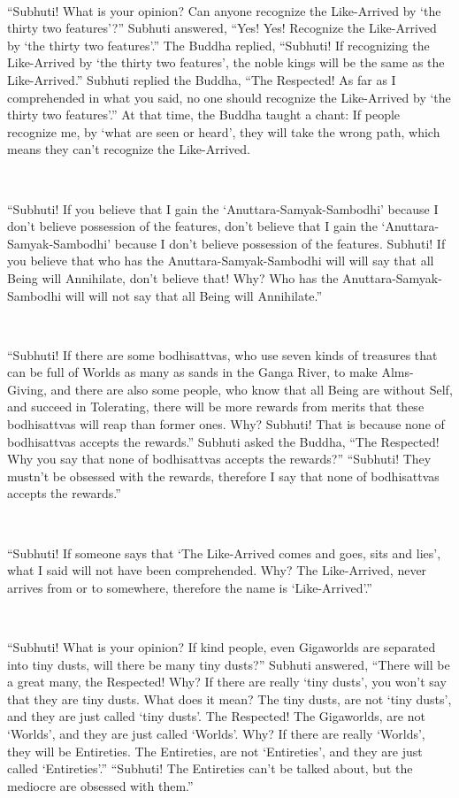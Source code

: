 \documentclass[a5paper,12pt]{book}
\begin{document}
    ~

     ``Subhuti! What is your opinion? Can anyone recognize the Like-Arrived by `the thirty two features'?'' Subhuti answered, ``Yes! Yes! Recognize the Like-Arrived by `the thirty two features'.'' The Buddha replied, ``Subhuti! If recognizing the Like-Arrived by `the thirty two features', the noble kings will be the same as the Like-Arrived.'' Subhuti replied the Buddha, ``The Respected! As far as I comprehended in what you said, no one should recognize the Like-Arrived by `the thirty two features'.'' At that time, the Buddha taught a chant: If people recognize me, by `what are seen or heard', they will take the wrong path, which means they can't recognize the Like-Arrived.

    ~

     ``Subhuti! If you believe that I gain the `Anuttara-Samyak-Sambodhi' because I don't believe possession of the features, don't believe that I gain the `Anuttara-Samyak-Sambodhi' because I don't believe possession of the features. Subhuti! If you believe that who has the Anuttara-Samyak-Sambodhi will will say that all Being will Annihilate, don't believe that! Why? Who has the Anuttara-Samyak-Sambodhi will will not say that all Being will Annihilate.''

    ~

     ``Subhuti! If there are some bodhisattvas, who use seven kinds of treasures that can be full of Worlds as many as sands in the Ganga River, to make Alms-Giving, and there are also some people, who know that all Being are without Self, and succeed in Tolerating, there will be more rewards from merits that these bodhisattvas will reap than former ones. Why? Subhuti! That is because none of bodhisattvas accepts the rewards.'' Subhuti asked the Buddha, ``The Respected! Why you say that none of bodhisattvas accepts the rewards?'' ``Subhuti! They mustn't be obsessed with the rewards, therefore I say that none of bodhisattvas accepts the rewards.''

    ~

     ``Subhuti! If someone says that `The Like-Arrived comes and goes, sits and lies', what I said will not have been comprehended. Why? The Like-Arrived, never arrives from or to somewhere, therefore the name is `Like-Arrived'.''

    ~

     ``Subhuti! What is your opinion? If kind people, even Gigaworlds are separated into tiny dusts, will there be many tiny dusts?'' Subhuti answered, ``There will be a great many, the Respected! Why? If there are really `tiny dusts', you won't say that they are tiny dusts. What does it mean? The tiny dusts, are not `tiny dusts', and they are just called `tiny dusts'. The Respected! The Gigaworlds, are not `Worlds', and they are just called `Worlds'. Why? If there are really `Worlds', they will be Entireties. The Entireties, are not `Entireties', and they are just called `Entireties'.'' ``Subhuti! The Entireties can't be talked about, but the mediocre are obsessed with them.''
\end{document}

